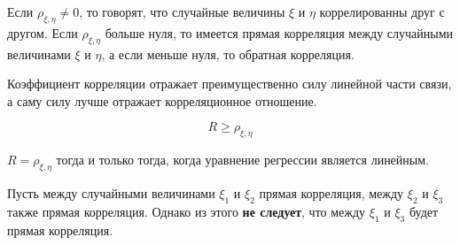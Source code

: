 \begin{definition}
  Если \(\rho_{\xi, \eta} \neq 0\), то говорят, что случайные величины \(\xi\) и
  \(\eta\) коррелированны друг с другом. Если \(\rho_{\xi, \eta}\) больше нуля,
  то имеется прямая корреляция между случайными величинами \(\xi\) и \(\eta\), а
  если меньше нуля, то обратная корреляция.
\end{definition}

\begin{remark}
  Коэффициент корреляции отражает преимущественно силу линейной части связи, а
  саму силу лучше отражает корреляционное отношение.
\end{remark}

\begin{theorem}
  \begin{equation*}
    R \ge \rho_{\xi, \eta}
  \end{equation*}
\end{theorem}

\begin{remark}
  \(R = \rho_{\xi, \eta}\) тогда и только тогда, когда уравнение регрессии
  является линейным.
\end{remark}

\begin{example}
  Пусть между случайными величинами \(\xi_1\) и \(\xi_2\) прямая корреляция,
  между \(\xi_2\) и \(\xi_3\) также прямая корреляция. Однако из этого
  \textbf{не следует}, что между \(\xi_1\) и \(\xi_3\) будет прямая корреляция.
\end{example}
